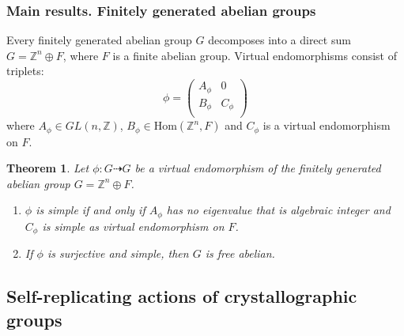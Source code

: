 \documentclass[notheorems,handout,san serif,hyperref={unicode}]{beamer} %
\newcommand{\Hom}{\text{Hom}}
\newtheorem{theorem}{Theorem}[section]
\theoremstyle{definition}
\begin{document}
\begin{frame}
	\frametitle{Main results. Finitely generated abelian groups}
	Every finitely generated abelian group $G$ decomposes into a direct sum $G = \mathbb{Z}^n \oplus F$, where $F$ is a finite abelian group. Virtual endomorphisms consist of triplets: 
	\begin{equation} \label{eq:general form of virt_end of finit-gen abelian}
		\phi = \begin{pmatrix}
			A_\phi & 0 \\ 
			B_\phi & C_\phi \\
		\end{pmatrix}
	\end{equation} 
	where $A_\phi \in GL(n, \mathbb{Z})$, $B_\phi \in \Hom(\mathbb{Z}^n, F)$ and $C_\phi$ is a virtual endomorphism on $F$. 
	
	
	\begin{theorem}\label{theorem: self-similar fintely generated}
		Let $\phi : G \dashrightarrow G$ be a virtual endomorphism  of the finitely generated abelian group $G = \mathbb{Z}^n \oplus F$. 
		
		\begin{enumerate}
			\item $\phi$ is simple if and only if $A_\phi$ has no eigenvalue that is algebraic integer and $C_\phi$ is simple as virtual endomorphism on $F$.
			
			\item If $\phi$ is surjective and simple, then $G$ is free abelian.
		\end{enumerate}
		
	\end{theorem}

\end{frame}

\subsection{Self-replicating actions of crystallographic groups}
\end{document}
